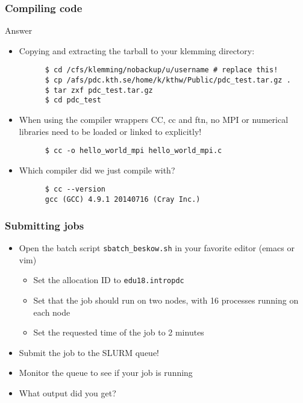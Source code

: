\begin{frame}[fragile]
  \frametitle{Compiling code}
\begin{exampleblock}{{Answer}}
    \verbatimfont{\footnotesize}
    \begin{itemize}
    \item Copying and extracting the tarball to your klemming directory:
    \begin{verbatim}
      $ cd /cfs/klemming/nobackup/u/username # replace this!
      $ cp /afs/pdc.kth.se/home/k/kthw/Public/pdc_test.tar.gz .
      $ tar zxf pdc_test.tar.gz
      $ cd pdc_test
    \end{verbatim}

    \item When using the compiler wrappers CC, cc and ftn, no MPI or numerical libraries need to be loaded 
      or linked to explicitly!
    \begin{verbatim}
      $ cc -o hello_world_mpi hello_world_mpi.c
    \end{verbatim}
    \item Which compiler did we just compile with?
    \begin{verbatim}
      $ cc --version
      gcc (GCC) 4.9.1 20140716 (Cray Inc.)
    \end{verbatim}

    \end{itemize}

\end{exampleblock}
\end{frame}


\begin{frame}[fragile]
  \frametitle{Submitting jobs}
\begin{itemize}
  \item Open the batch script \verb|sbatch_beskow.sh| in your favorite editor (emacs or vim)
    \begin{itemize}
      \item Set the allocation ID to \verb|edu18.intropdc|
      \item Set that the job should run on two nodes, with 16 processes running on each node
      \item Set the requested time of the job to 2 minutes
    \end{itemize}
  \item Submit the job to the SLURM queue!
  \item Monitor the queue to see if your job is running
  \item What output did you get?
\end{itemize}
\end{frame}


